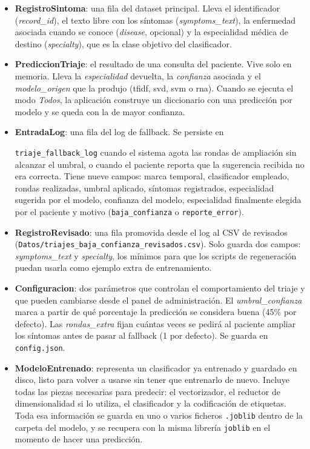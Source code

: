 \begin{itemize}
	\item \textbf{RegistroSintoma}: una fila del dataset principal. Lleva el identificador (\textit{record\_id}), el texto libre con los síntomas (\textit{symptoms\_text}), la enfermedad asociada cuando se conoce (\textit{disease}, opcional) y la especialidad médica de destino (\textit{specialty}), que es la clase objetivo del clasificador.
	\item \textbf{PrediccionTriaje}: el resultado de una consulta del paciente. Vive solo en memoria. Lleva la \textit{especialidad} devuelta, la \textit{confianza} asociada y el \textit{modelo\_origen} que la produjo (\acrshort{tfidf}, \acrshort{svd}, \acrshort{svm} o \acrshort{rna}). Cuando se ejecuta el modo \textit{Todos}, la aplicación construye un diccionario con una predicción por modelo y se queda con la de mayor confianza.
	\item \textbf{EntradaLog}: una fila del log de fallback. Se persiste en
	
	\texttt{triaje\_fallback\_log} cuando el sistema agota las rondas de ampliación sin alcanzar el umbral, o cuando el paciente reporta que la sugerencia recibida no era correcta. Tiene nueve campos: marca temporal, clasificador empleado, rondas realizadas, umbral aplicado, síntomas registrados, especialidad sugerida por el modelo, confianza del modelo, especialidad finalmente elegida por el paciente y motivo (\texttt{baja\_confianza} o \texttt{reporte\_error}).
	\item \textbf{RegistroRevisado}: una fila promovida desde el log al CSV de revisados (\texttt{Datos/triajes\_baja\_confianza\_revisados.csv}). Solo guarda dos campos: \textit{symptoms\_text} y \textit{specialty}, los mínimos para que los scripts de regeneración puedan usarla como ejemplo extra de entrenamiento.
	\item \textbf{Configuracion}: dos parámetros que controlan el comportamiento del triaje y que pueden cambiarse desde el panel de administración. El \textit{umbral\_confianza} marca a partir de qué porcentaje la predicción se considera buena (45\% por defecto). Las \textit{rondas\_extra} fijan cuántas veces se pedirá al paciente ampliar los síntomas antes de pasar al fallback (1 por defecto). Se guarda en \texttt{config.json}.
	\item \textbf{ModeloEntrenado}: representa un clasificador ya entrenado y guardado en disco, listo para volver a usarse sin tener que entrenarlo de nuevo. Incluye todas las piezas necesarias para predecir: el vectorizador, el reductor de dimensionalidad si lo utiliza, el clasificador y la codificación de etiquetas. Toda esa información se guarda en uno o varios ficheros \texttt{.joblib} dentro de la carpeta del modelo, y se recupera con la misma librería \texttt{joblib} en el momento de hacer una predicción.
\end{itemize}


